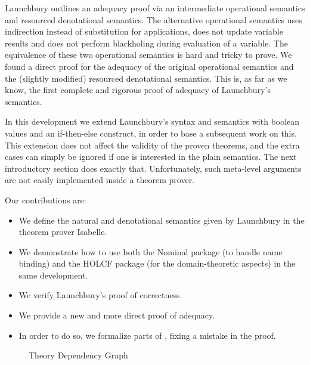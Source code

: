 \documentclass[11pt,a4paper,parskip=half]{scrartcl}
\begin{document}
Launchbury outlines an adequacy proof via an intermediate operational semantics and resourced denotational semantics. The alternative operational semantics  uses indirection instead of substitution for applications, does not update variable results and does not perform blackholing during evaluation of a variable. The equivalence of these two operational semantics is hard and tricky to prove. We found a direct proof for the adequacy of the original operational semantics and the (slightly modified) resourced denotational semantics. This is, as far as we know, the first complete and rigorous proof of adequacy of Launchbury's semantics.

In this development we extend Launchbury’s syntax and semantics with boolean values and an if-then-else construct, in order to base a subsequent work \cite{callarita-afp} on this. This extension does not affect the validity of the proven theorems, and the extra cases can simply be ignored if one is interested in the plain semantics. The next introductory section does exactly that. Unfortunately, such meta-level arguments are not easily implemented inside a theorem prover.

Our contributions are:
\begin{itemize}
\item We define the natural and denotational semantics given by Launchbury in the theorem prover Isabelle.
\item We demonstrate how to use both the Nominal package (to handle name binding) \cite{nominal} and the HOLCF \cite{holcf} package (for the domain-theoretic aspects) in the same development.
\item We verify Launchbury's proof of correctness.
\item We provide a new and more direct proof of adequacy.
\item In order to do so, we formalize parts of \cite{functionspaces}, fixing a mistake in the proof.
\end{itemize}

%




\begin{figure}
\begin{center}
\end{center}
\caption{Theory Dependency Graph\label{theory-deps}}
\end{figure}
\end{document}
